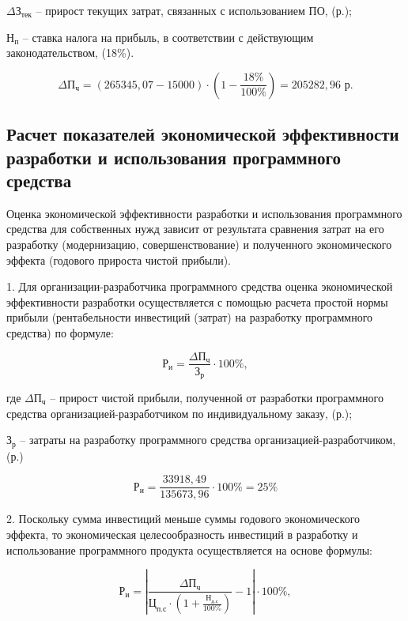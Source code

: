     $\text{$\Delta$З}_{\text{тек}}$ -- прирост текущих затрат, связанных с использованием ПО,
(р.);

    $\text{Н}_{\text{п}}$ -- ставка налога на прибыль, в соответствии с действующим законодательством, (18\%).


$$
    \text{$\Delta$П}_{\text{ч}} = (265345,07 - 15000)\cdot (1-\frac{18\%}{100\%}) = 205282,96 \text{ р}.
$$

\subsection{Расчет показателей экономической эффективности разработки и использования программного средства}

Оценка экономической эффективности разработки и использования программного средства для собственных нужд зависит от результата сравнения затрат на его разработку (модернизацию, совершенствование) и полученного экономического эффекта (годового прироста чистой прибыли).

1. Для организации-разработчика программного средства оценка экономической эффективности разработки осуществляется с помощью расчета простой нормы прибыли (рентабельности инвестиций (затрат) на разработку программного средства) по формуле:

\begin{equation}
    \text{Р}_{\text{и}} = \frac{\text{$\Delta$П}_{\text{ч}}}{\text{З}_{\text{р}}} \cdot 100\%,
\end{equation}

где $\text{$\Delta$П}_{\text{ч}}$ -- прирост чистой прибыли, полученной от разработки программного средства организацией-разработчиком по индивидуальному заказу, (р.);

$\text{З}_{\text{р}}$ -- затраты на разработку программного средства организацией-разработчиком,  (р.)


\begin{equation}
    \text{Р}_{\text{и}} = \frac{33918,49}{135673,96} \cdot 100\% = 25\%
\end{equation}

2. Поскольку сумма инвестиций меньше суммы годового экономического эффекта, то экономическая целесообразность инвестиций в разработку и использование программного продукта осуществляется на основе формулы: 

\begin{equation}
    \text{Р}_{\text{и}} = |\frac{\text{$\Delta$П}_{\text{ч}}}{\text{Ц}_{\text{п.с}} \cdot (1 + \frac{\text{Н}_{\text{д.с}}}{100\%})} - 1| \cdot 100\%,
\end{equation}

